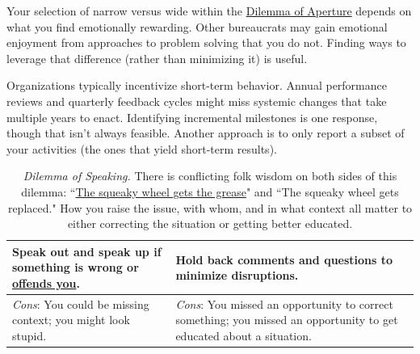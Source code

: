 Your selection of narrow versus wide within the \hyperref[table:dilemma-personal-focus-vs-systemic]{Dilemma of Aperture} depends on what you find emotionally rewarding. Other bureaucrats may gain emotional enjoyment from approaches to problem solving that you do not. Finding ways to leverage that difference (rather than minimizing it) is useful. 

Organizations typically incentivize short-term behavior. Annual performance reviews and quarterly feedback cycles might miss systemic changes that take multiple years to enact. Identifying incremental milestones is one response, though that isn't always feasible. Another approach is to only report a subset of your activities (the ones that yield short-term results). 

\begin{center}
\begin{table}[H] %
\begin{tabular}{ | m{\dilemmatablewidth}| m{\dilemmatablewidth} | } 
  \hline
  \textbf{Speak out and speak up if something is wrong or \href{https://en.wikipedia.org/wiki/Moral_injury}{offends you}.
  \index{Wikipedia!\href{https://en.wikipedia.org/wiki/Moral_injury}{moral injury}}
  } &
  \textbf{Hold back comments and questions to minimize disruptions.} \\
  \hline
  \textit{Cons}: You could be missing context; you might look stupid. & 
  \textit{Cons}: You missed an opportunity to correct something; you missed an opportunity to get educated about a situation. \\
  \hline
\end{tabular}
\caption{
\textit{Dilemma of Speaking.}
There is conflicting folk wisdom on both sides of this dilemma: 
``\href{https://en.wikipedia.org/wiki/The_squeaky_wheel_gets_the_grease}{The squeaky wheel gets the grease}" 
and 
``The squeaky wheel gets replaced." 
How you raise the issue, with whom, and in what context all matter to either correcting the situation or getting better educated.
}
\label{table:dilemma-personal-speak-up-or-hold-back}
\end{table}
\end{center}

